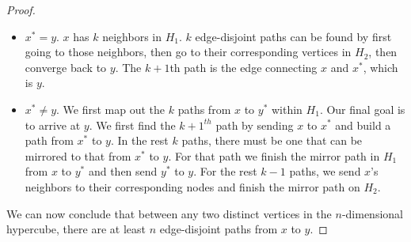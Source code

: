 \documentclass[11pt]{article}
\begin{document}
\begin{Answer}
\begin{proof}
\begin{itemize}
                  \begin{itemize}
                      \item $x^*=y$. $x$ has $k$ neighbors in $H_1$. $k$ edge-disjoint paths can be found by first going 
                            to those neighbors, then go to their corresponding vertices in $H_2$, then converge back to $y$. The
                            $k+1$th path is the edge connecting $x$ and $x^*$, which is $y$.
                      \item $x^*\neq y$. We first map out the $k$ paths from $x$ to $y^*$ within $H_1$. Our final goal is to arrive 
                            at $y$. We first find the $k+1^{th}$ path by sending $x$ to $x^*$ and build a path from $x^*$ to $y$. 
                            In the rest $k$ paths, there must be one that can be mirrored to that from $x^*$ to $y$. For that path 
                            we finish the mirror path in $H_1$ from $x$ to $y^*$ and then send $y^*$ to $y$. For the rest $k-1$ paths,
                            we send $x$'s neighbors to their corresponding nodes and finish the mirror path on $H_2$. 
                  \end{itemize}
        \end{itemize}
        We can now conclude that between any two distinct vertices in the $n$-dimensional hypercube, there are at least $n$ 
        edge-disjoint paths from $x$ to $y$.
    \end{proof}
\end{Answer}

\newpage
{}
\end{document}
